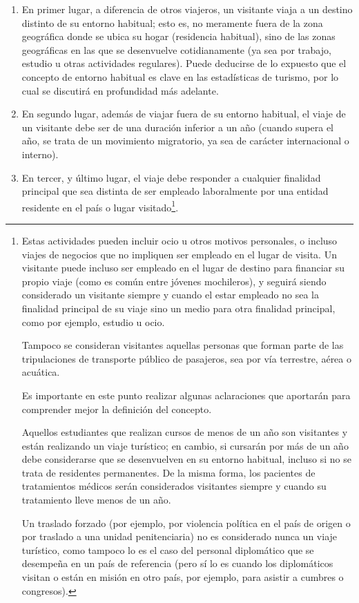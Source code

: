 \documentclass[
  openany]{book}
\begin{document}
\begin{enumerate}
\def\labelenumi{\arabic{enumi}.}
\item
  En primer lugar, a diferencia de otros viajeros, un visitante viaja a un destino distinto de su entorno habitual; esto es, no meramente fuera de la zona geográfica donde se ubica su hogar (residencia habitual), sino de las zonas geográficas en las que se desenvuelve cotidianamente (ya sea por trabajo, estudio u otras actividades regulares). Puede deducirse de lo expuesto que el concepto de entorno habitual es clave en las estadísticas de turismo, por lo cual se discutirá en profundidad más adelante.
\item
  En segundo lugar, además de viajar fuera de su entorno habitual, el viaje de un visitante debe ser de una duración inferior a un año (cuando supera el año, se trata de un movimiento migratorio, ya sea de carácter internacional o interno).
\item
  En tercer, y último lugar, el viaje debe responder a cualquier finalidad principal que sea distinta de ser empleado laboralmente por una entidad residente en el país o lugar visitado\footnote{Estas actividades pueden incluir ocio u otros motivos personales, o incluso viajes de negocios que no impliquen ser empleado en el lugar de visita. Un visitante puede incluso ser empleado en el lugar de destino para financiar su propio viaje (como es común entre jóvenes mochileros), y seguirá siendo considerado un visitante siempre y cuando el estar empleado no sea la finalidad principal de su viaje sino un medio para otra finalidad principal, como por ejemplo, estudio u ocio.

    Tampoco se consideran visitantes aquellas personas que forman parte de las tripulaciones de transporte público de pasajeros, sea por vía terrestre, aérea o acuática.

    Es importante en este punto realizar algunas aclaraciones que aportarán para comprender mejor la definición del concepto.

    Aquellos estudiantes que realizan cursos de menos de un año son visitantes y están realizando un viaje turístico; en cambio, si cursarán por más de un año debe considerarse que se desenvuelven en su entorno habitual, incluso si no se trata de residentes permanentes. De la misma forma, los pacientes de tratamientos médicos serán considerados visitantes siempre y cuando su tratamiento lleve menos de un año.

    Un traslado forzado (por ejemplo, por violencia política en el país de origen o por traslado a una unidad penitenciaria) no es considerado nunca un viaje turístico, como tampoco lo es el caso del personal diplomático que se desempeña en un país de referencia (pero sí lo es cuando los diplomáticos visitan o están en misión en otro país, por ejemplo, para asistir a cumbres o congresos).}.
\end{enumerate}
\end{document}
